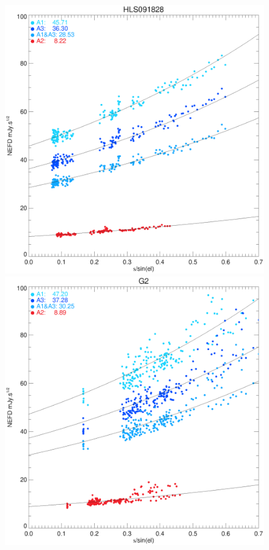 \begin{figure}
\begin{center}
\includegraphics[clip, angle=0, scale =0.42]{Figures/hls_NEFD_vs_TauElev_all.eps}
\includegraphics[clip, angle=0, scale =0.42]{Figures/g2_NEFD_vs_TauElev_all.eps}
\caption[NEFD deep integration]{}
\label{fig:time_comparison}
\end{center}
\end{figure}


